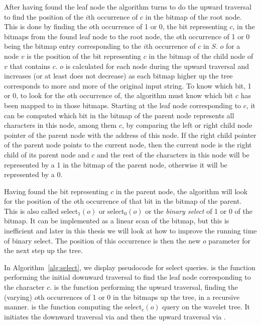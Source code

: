After having found the leaf node the algorithm turns to do the upward traversal to find the position of the $i$th occurrence of $c$ in the bitmap of the root node.
This is done by finding the $o$th occurrence of 1 or 0, the bit representing $c$, in the bitmaps from the found leaf node to the root node, the $o$th occurrence of 1 or 0 being the bitmap entry corresponding to the $i$th occurrence of $c$ in $S$.
$o$ for a node $v$ is the position of the bit representing $c$ in the bitmap of the child node of $v$ that contains $c$.
$o$ is calculated for each node during the upward traversal and increases (or at least does not decrease) as each bitmap higher up the tree corresponds to more and more of the original input string.
To know which bit, 1 or 0, to look for the $o$th occurrence of, the algorithm must know which bit $c$ has been mapped to in those bitmaps.
Starting at the leaf node corresponding to $c$, it can be computed which bit in the bitmap of the parent node represents all characters in this node, among them $c$, by comparing the left or right child node pointer of the parent node with the address of this node.
If the right child pointer of the parent node points to the current node, then the current node is the right child of its parent node and $c$ and the rest of the characters in this node will be represented by a 1 in the bitmap of the parent node, otherwise it will be represented by a 0.

Having found the bit representing $c$ in the parent node, the algorithm will look for the position of the $o$th occurrence of that bit in the bitmap of the parent.
This is also called select$_1(o)$ or select$_0(o)$ or the \textit{binary select} of 1 or 0 of the bitmap.
It can be implemented as a linear scan of the bitmap, but this is inefficient and later in this thesis we will look at how to improve the running time of binary select.
The position of this occurrence is then the new $o$ parameter for the next step up the tree.

In Algorithm~\ref{alg:select}, we display pseudocode for select queries.
 is the function performing the initial downward traversal to find the leaf node corresponding to the character $c$.
 is the function performing the upward traversal, finding the (varying) $o$th occurrences of 1 or 0 in the bitmaps up the tree, in a recursive manner.
 is the function computing the select$_{c}(o)$ query on the wavelet tree.
It initiates the downward traversal via  and then the upward traversal via .

